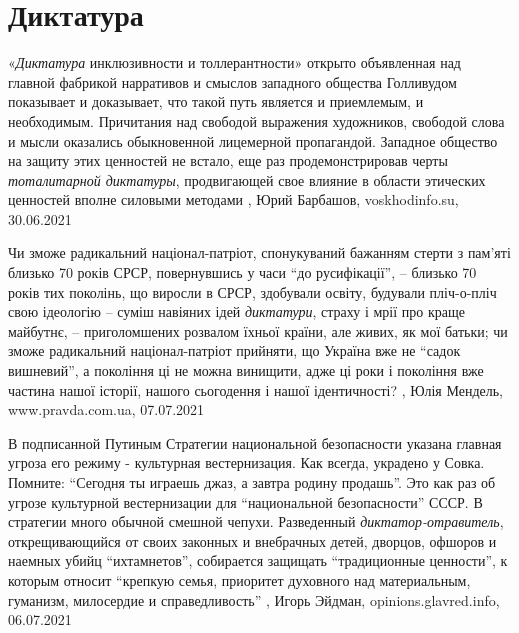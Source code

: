  
 
 
 
 
\chapter{Диктатура}

«\emph{Диктатура} инклюзивности и толлерантности» открыто объявленная над главной
фабрикой нарративов и смыслов западного общества Голливудом показывает и
доказывает, что такой путь является и приемлемым, и необходимым. Причитания над
свободой выражения художников, свободой слова и мысли оказались обыкновенной
лицемерной пропагандой. Западное общество на защиту этих ценностей не встало,
еще раз продемонстрировав черты \emph{тоталитарной диктатуры}, продвигающей свое
влияние в области этических ценностей вполне силовыми методами
, 
Юрий Барбашов, voskhodinfo.su, 30.06.2021

Чи зможе радикальний націонал-патріот, спонукуваний бажанням стерти з пам’яті
близько 70 років СРСР, повернувшись у часи \enquote{до русифікації}, – близько 70 років
тих поколінь, що виросли в СРСР, здобували освіту, будували пліч-о-пліч свою
ідеологію – суміш навіяних ідей \emph{диктатури}, страху і мрії про краще майбутнє, –
приголомшених розвалом їхньої країни, але живих, як мої батьки; чи зможе
радикальний націонал-патріот прийняти, що Україна вже не \enquote{садок вишневий}, а
покоління ці не можна винищити, адже ці роки і покоління вже частина нашої
історії, нашого сьогодення і нашої ідентичності?
, 
Юлія Мендель, www.pravda.com.ua, 07.07.2021

В подписанной Путиным Стратегии национальной безопасности указана главная
угроза его режиму - культурная вестернизация. Как всегда, украдено у Совка.
Помните: \enquote{Сегодня ты играешь джаз, а завтра родину продашь}. Это как раз об
угрозе культурной вестернизации для \enquote{национальной безопасности} СССР.
В стратегии много обычной смешной чепухи. Разведенный \emph{диктатор-отравитель},
открещивающийся от своих законных и внебрачных детей, дворцов, офшоров и
наемных убийц \enquote{ихтамнетов}, собирается защищать \enquote{традиционные ценности}, к
которым относит \enquote{крепкую семья, приоритет духовного над материальным, гуманизм,
милосердие и справедливость}
, 
Игорь Эйдман, opinions.glavred.info, 06.07.2021

